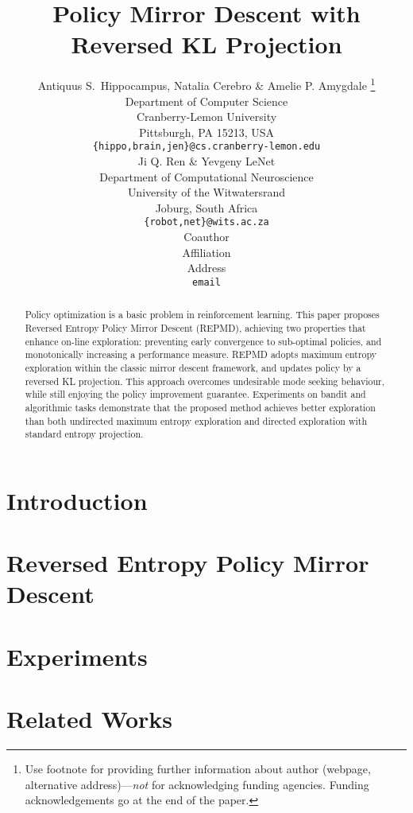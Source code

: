 \documentclass{article} %
\title{Policy Mirror Descent with Reversed KL Projection}
\author{Antiquus S.~Hippocampus, Natalia Cerebro \& Amelie P. Amygdale \thanks{ Use footnote for providing further information
about author (webpage, alternative address)---\emph{not} for acknowledging
funding agencies.  Funding acknowledgements go at the end of the paper.} \\
Department of Computer Science\\
Cranberry-Lemon University\\
Pittsburgh, PA 15213, USA \\
\texttt{\{hippo,brain,jen\}@cs.cranberry-lemon.edu} \\
\And
Ji Q. Ren \& Yevgeny LeNet \\
Department of Computational Neuroscience \\
University of the Witwatersrand \\
Joburg, South Africa \\
\texttt{\{robot,net\}@wits.ac.za} \\
\AND
Coauthor \\
Affiliation \\
Address \\
\texttt{email}
}
\begin{document}
\maketitle

\begin{abstract}
Policy optimization is a basic problem in reinforcement learning. This paper proposes Reversed Entropy Policy Mirror Descent (REPMD), achieving two properties that enhance on-line exploration: preventing early convergence to  sub-optimal policies, and monotonically increasing a performance measure. REPMD adopts maximum entropy exploration within the classic mirror descent framework, and updates policy by a reversed KL projection. This approach overcomes undesirable mode seeking behaviour, while still enjoying the policy improvement guarantee. Experiments on bandit and algorithmic tasks demonstrate that the proposed method achieves better exploration than both undirected maximum entropy exploration and directed exploration with standard entropy projection.
\end{abstract}

\section{Introduction}
\label{sec:intro}


%

\section{Reversed Entropy Policy Mirror Descent}
\label{sec:reversed_emtropy_policy_mirror_descent}


\section{Experiments}
\label{sec:experiments}


\section{Related Works}
\label{sec:related_work}

\end{document}
